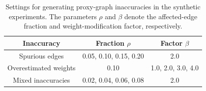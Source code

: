 \begin{table}[t]
\centering
\caption{Settings for generating proxy-graph inaccuracies in the synthetic experiments.
The parameters $\rho$ and $\beta$ denote the affected-edge fraction and weight-modification factor, respectively.}
\label{tab:synthetic_settings}
\begin{tabular}{ccc}
\toprule
Inaccuracy & Fraction $\rho$ & Factor $\beta$ \\
\midrule
Spurious edges & 0.05, 0.10, 0.15, 0.20 & 2.0 \\
Overestimated weights & 0.10 & 1.0, 2.0, 3.0, 4.0 \\
Mixed inaccuracies & 0.02, 0.04, 0.06, 0.08 & 2.0 \\
\bottomrule
\end{tabular}
\end{table}

